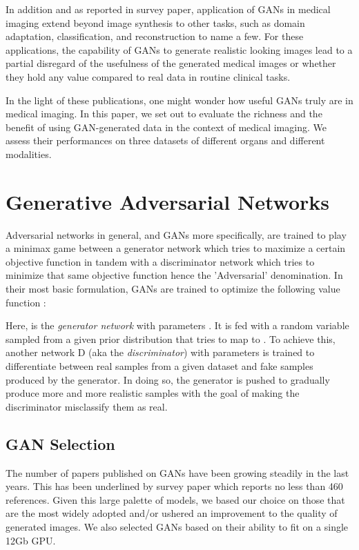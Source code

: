 \documentclass[preprint,12pt, authoryear]{elsarticle}
\begin{document}
In addition and as reported in  \cite{Kazeminia2020GANsFM} survey paper, application of GANs in medical imaging extend beyond image synthesis to other tasks, such as domain adaptation, classification, and reconstruction to name a few.
For these applications, the capability of GANs to generate realistic looking images lead to a partial disregard of the usefulness of the generated medical images or whether they hold any value compared to real data in routine clinical tasks.

In the light of these publications, one might wonder how useful GANs truly are in medical imaging.
In this paper, we set out to evaluate the richness and the benefit of using GAN-generated data in the context of medical imaging.  We assess their performances on three datasets of different organs and different modalities.

\section{Generative Adversarial Networks}
\label{sec:gans}
Adversarial networks in general, and GANs more specifically, are trained to play a minimax game between a generator network which tries to maximize a certain objective function in tandem with a discriminator network which tries to minimize that same objective function hence the 'Adversarial' denomination. In their most basic formulation, GANs are trained to optimize the following value function \citep{Goodfellow2014GenerativeAN}:


Here,  is the {\em generator network} with parameters . It is fed with a random variable  sampled from a given prior distribution that  tries to map to . To achieve this, another network D (aka the {\em discriminator}) with parameters  is trained to differentiate between real samples  from a given dataset and fake samples  produced by the generator. In doing so, the generator is pushed to gradually produce more and more realistic samples with the goal of making the discriminator misclassify them as real.

\subsection{GAN Selection}
The number of papers published on GANs have been growing steadily in the last years.  This has been underlined by \cite{Gonog2019ARG} survey paper which reports no less than 460 references.  Given this large palette of models, we based our choice on those that are the most widely adopted and/or ushered an improvement to the quality of generated images.  We also selected GANs based on their ability to fit on a single 12Gb GPU.
\end{document}
